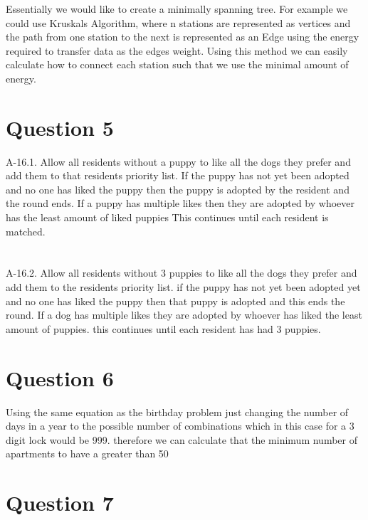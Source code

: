 \documentclass[10pt]{article}
\begin{document}
Essentially we would like to create a minimally spanning tree. For example we could use Kruskals Algorithm, where n stations are represented as vertices and the path from one station to the next is represented as an Edge using the energy required to transfer data as the edges weight. Using this method we can easily calculate how to connect each station such that we use the minimal amount of energy.

\section*{Question 5}


A-16.1. Allow all residents without a puppy to like all the dogs they prefer and add them to that residents priority list. If the puppy has not yet been adopted and no one has liked the puppy then the puppy is adopted by the resident and the round ends. If a puppy has multiple likes then they are adopted by whoever has the least amount of liked puppies This continues until each resident is matched.
\section*{}

A-16.2. Allow all residents without 3 puppies to like all the dogs they prefer and add them to the residents priority list. if the puppy has not yet been adopted yet and no one has liked the puppy then that puppy is adopted and this ends the round. If a dog has multiple likes they are adopted by whoever has liked the least amount of puppies. this continues until each resident has had 3 puppies.

\section*{Question 6}

Using the same equation as the birthday problem just changing the number of days in a year to the possible number of combinations which in this case for a 3 digit lock would be 999.
therefore we can calculate that the minimum number of apartments to have a greater than 50%



\section*{Question 7}
\end{document}
